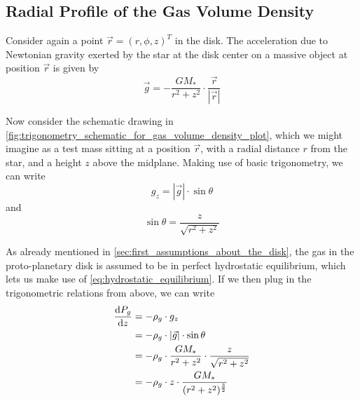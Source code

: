     \newpage\subsection{Radial Profile of the Gas Volume Density}
        
        Consider again a point $\vec r=(r,\phi,z)^T$ in the disk. 
        The acceleration due to Newtonian gravity exerted by the star at the disk center 
        on a massive object at position $\vec r$ is given by
        \begin{equation}
            \vec g = -\frac{GM_*}{r^2+z^2} \cdot \frac{\vec r}{|\vec r|}
        \end{equation}

        Now consider the schematic drawing in
        \cref{fig:trigonometry_schematic_for_gas_volume_density_plot}, which we might imagine as 
        a test mass sitting at a position $\vec r$, with a radial distance $r$ from the star, and 
        a height $z$ above the midplane. Making use of basic trigonometry, we can write
        \begin{equation}
            g_z = |\vec g| \cdot \sin\theta
        \end{equation}
        and
        \begin{equation}
            \sin\theta=\frac{z}{\sqrt{r^2+z^2}}
        \end{equation}

        As already mentioned in \cref{sec:first_assumptions_about_the_disk}, the gas in the 
        proto-planetary disk is assumed to be in perfect hydrostatic equilibrium, which lets us 
        make use of \cref{eq:hydrostatic_equilibrium}. If we then plug in the trigonometric 
        relations from above, we can write
        \begin{align}
            \frac{\text{d} P_g}{\text{d} z}
                &= -\rho_g \cdot g_z \\
                &= -\rho_g \cdot |\vec g| \cdot \sin\theta \\
                &= -\rho_g \cdot \frac{GM_*}{r^2+z^2} \cdot\frac{z}{\sqrt{r^2+z^2}} \\
                &= -\rho_g \cdot z \cdot\frac{GM_*}{ (r^2+z^2)^{\frac{3}{2}} }
                \label{eq:hydrostatic_equilibrium_with_plugged_in_trigonometry}
        \end{align}

